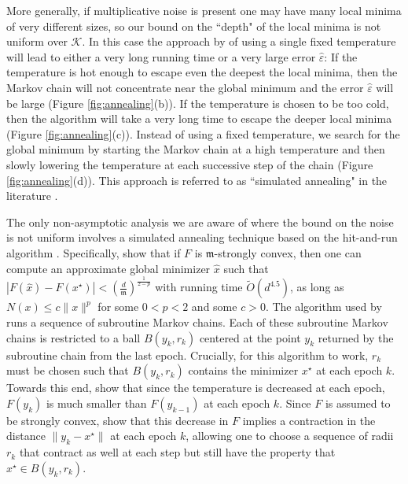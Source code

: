\documentclass[final,12pt]{colt2018} %
\begin{document}
{More generally, if multiplicative noise is present one may have many local minima of very different sizes, so our bound on the ``depth" of the local minima is not uniform over $\mathcal{K}$.
%
  In this case the approach by \cite{hitting_times} of using a single fixed temperature will lead to either a very long running time or a very large error $\hat{\varepsilon}$:  If the temperature is hot enough to escape even the deepest the local minima, then the Markov chain will not concentrate near the global minimum and the error $\hat{\varepsilon}$ will be large  (Figure \ref{fig:annealing}(b)). 
   If the temperature is chosen to be too cold, then the algorithm will take a very long time to escape the deeper local minima (Figure \ref{fig:annealing}(c)).
 Instead of using a fixed temperature, we  search for the global minimum by starting the Markov chain at a high temperature and then slowly lowering the temperature at each successive step of the chain (Figure \ref{fig:annealing}(d)). This approach is referred to as ``simulated annealing" in the literature \citep{kirkpatrick1983optimization}.


The only non-asymptotic analysis we are aware of where the bound on the noise is not uniform involves a simulated annealing technique based on the hit-and-run algorithm \citep{Simulated_Annealing_Nonassymptotic}.  
%
  Specifically,  \cite{Simulated_Annealing_Nonassymptotic} show that if $F$ is $\mathfrak{m}$-strongly convex, then one can compute an approximate global minimizer $\hat{x}$ such that $|F(\hat{x}) - F(x^\star)| < (\frac{d}{\mathfrak{m}})^{\frac{1}{2-p}}$ with running time $\tilde{O}(d^{4.5})$, as long as $N(x) \leq c \|x\|^p$ for some $0<p<2$ and some $c>0$.
 The algorithm used by \cite{Simulated_Annealing_Nonassymptotic} runs a sequence of subroutine Markov chains.
 Each of these subroutine Markov chains is restricted to a ball $B(y_k,r_k)$ centered at the point $y_k$ returned by the subroutine chain from the last epoch.  
 Crucially, for this algorithm to work, $r_k$ must be chosen such that $B(y_k,r_k)$ contains the minimizer $x^\star$ at each epoch $k$.
Towards this end, \cite{Simulated_Annealing_Nonassymptotic} show that since the temperature is decreased at each epoch, $F(y_k)$ is much smaller than $F(y_{k-1})$ at each epoch $k$.
%
Since $F$ is assumed to be strongly convex,  \cite{Simulated_Annealing_Nonassymptotic} show that this decrease in $F$ implies a contraction in the distance $\|y_k-x^\star\|$ at each epoch $k$, allowing one to choose a sequence of radii $r_k$ that contract as well at each step but still have the property that $x^\star \in B(y_k,r_k)$.
% 


}
\end{document}
